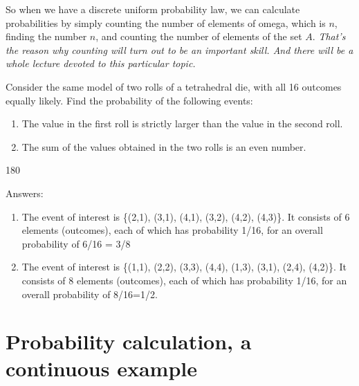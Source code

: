 \documentclass{tufte-handout}
\begin{document}
So when we have a discrete uniform probability law, we can calculate probabilities by simply counting
the number of elements of omega, which is $n$, finding the number $n$, and counting the number of
elements of the set $A$. \textit{That's the reason why counting will turn out to be an important skill. And there will
be a whole lecture devoted to this particular topic.}

Consider the same model of two rolls of a tetrahedral die, with all 16 outcomes equally likely. Find the probability of the following events:
\begin{enumerate}
\item The value in the first roll is strictly larger than the value in the second roll.
\item The sum of the values obtained in the two rolls is an even number.
\end{enumerate}

\begin{turn}{180} 
\color{teal}
\begin{minipage}{\linewidth}
Answers:
\scriptsize
\begin{enumerate}[(1)]
\item  The event of interest is \{(2,1), (3,1), (4,1), (3,2), (4,2), (4,3)\}. It consists of 6 elements (outcomes), each of which has probability 1/16, for an overall probability of 6/16 = 3/8
\item  The event of interest is \{(1,1), (2,2), (3,3), (4,4), (1,3), (3,1), (2,4), (4,2)\}. It consists of 8 elements (outcomes), each of which has probability 1/16, for an overall probability of 8/16=1/2.
\end{enumerate}
\end{minipage}
\end{turn}



\subsection{}\label{sec:outcomes}






\vspace{0.5cm}



\section{Probability calculation, a continuous example}\label{sec:continuous-example}
\end{document}
